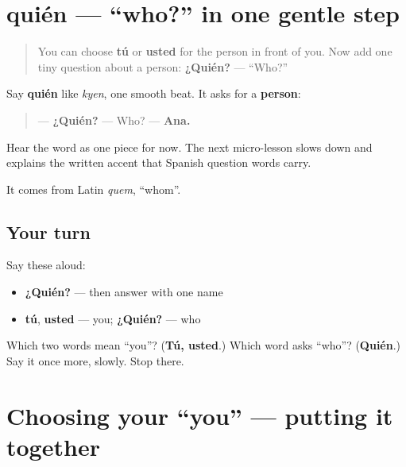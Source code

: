 \section[quién]{quién — “who?” in one gentle step}

\label{lesson:ES-C03-quien}



\begin{quote}
You can choose \textbf{tú} or \textbf{usted} for the person in front of you. Now add one tiny question about a person: \textbf{¿Quién?} — “Who?”
\end{quote}

\begin{cousinweb}
Say \textbf{quién} like \emph{kyen}, one smooth beat. It asks for a \textbf{person}:

\begin{quote}
— \textbf{¿Quién?} — Who? — \textbf{Ana.}
\end{quote}

Hear the word as one piece for now. The next micro-lesson slows down and explains the written accent that Spanish question words carry.

It comes from Latin \emph{quem}, \textquotedblleft{}whom\textquotedblright{}.
\end{cousinweb}

\subsection*{Your turn}
Say these aloud:

\begin{itemize}
\raggedright
  \item \textbf{¿Quién?} — then answer with one name
  \item \textbf{tú}, \textbf{usted} — you; \textbf{¿Quién?} — who
\end{itemize}

\begin{tcolorbox}[breakable,colback=teal!4,colframe=teal!35!black,title={Before you move on}]
Which two words mean “you”? (\textbf{Tú, usted}.) Which word asks “who”? (\textbf{Quién}.) Say it once more, slowly. Stop there.
\end{tcolorbox}
\section[Practice]{Choosing your \textquotedblleft{}you\textquotedblright{} — putting it together}

